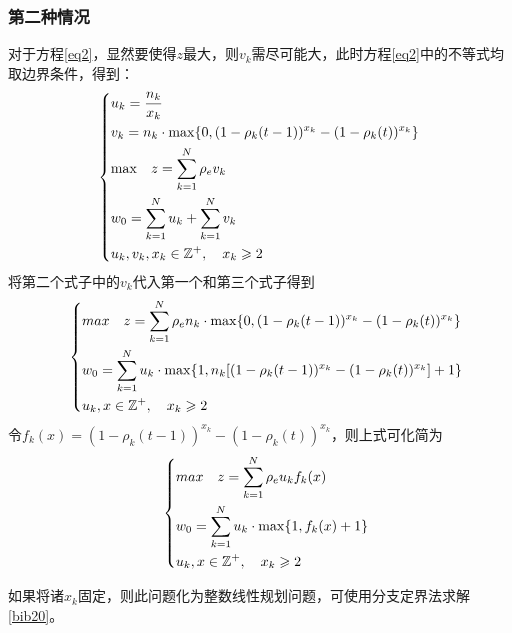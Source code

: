 \documentclass[withoutpreface,bwprint]{cumcmthesis} %
\begin{document}
\subsubsection{第二种情况}
对于方程\ref{eq2}，显然要使得$z$最大，则$v_k$需尽可能大，此时方程\ref{eq2}中的不等式均取边界条件，得到：
\begin{align}
\label{eq2solution1}
    \left\{
    \begin{aligned}
        &u_k =\dfrac{n_k}{x_k} \\
        &v_k =n_k \cdot {\rm max}
         \{0,(1-\rho_k(t-1))^{x_k}-(1-\rho_k(t))^{x_k} \} \\
        &{\rm max} \quad z = \sum^N_{k=1}\rho_e v_k  \\
        &w_0 =\sum^N_{k=1} u_k +\sum^N_{k=1} v_k  \\
        &u_k,v_k,x_k\in\mathbb{Z^+},\quad  x_k \geqslant 2  \\
    \end{aligned}
    \right.
\end{align}
将第二个式子中的$v_k$代入第一个和第三个式子得到
\begin{align}
\label{eq2solution1}
\quad\left\{
    \begin{aligned}
        &max\quad z = \sum^N_{k=1}\rho_e n_k \cdot {\rm max}
         \{0,(1-\rho_k(t-1))^{x_k} - (1-\rho_k(t))^{x_k} \}   \\
        &w_0 = \sum^N_{k=1} u_k\cdot {\rm max} \{1, n_k  [(1-\rho_k(t-1))^{x_k}-(1-\rho_k(t))^{x_k}] +1 \} \\
        &u_k,x\in\mathbb{Z^+}, \quad x_k \geqslant 2 \\
    \end{aligned}
    \right.
\end{align}
令$f_k(x) = (1-\rho_k(t-1))^{x_k}-(1-\rho_k(t))^{x_k}$，则上式可化简为
\begin{align}
\label{eq2solution1}
\quad\left\{
    \begin{aligned}
        &max\quad z = \sum^N_{k=1}\rho_e u_k f_k(x)  \\
        &w_0 = \sum^N_{k=1} u_k \cdot {\rm max}\{1,f_k(x)+1\}  \\
        &u_k,x\in\mathbb{Z^+},  \quad x_k \geqslant 2 \\
    \end{aligned}
    \right.
\end{align}

如果将诸$x_k$固定，则此问题化为整数线性规划问题，可使用分支定界法求解\ref{bib20}。
\end{document}
